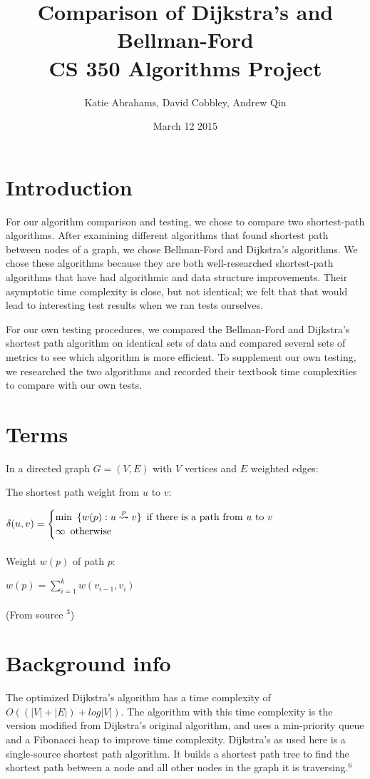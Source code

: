 \documentclass{article}
\title{Comparison of Dijkstra's and Bellman-Ford \\ CS 350 Algorithms Project}
\author{Katie Abrahams, David Cobbley, Andrew Qin}
\date{March 12 2015}
\begin{document}
\maketitle

\tableofcontents

\pagebreak

\section{Introduction}
For our algorithm comparison and testing, we chose to compare two shortest-path algorithms.  After examining different algorithms that found shortest path between nodes of a graph, we chose Bellman-Ford and Dijkstra's algorithms.  We chose these algorithms because they are both well-researched shortest-path algorithms that have had algorithmic and data structure improvements.  Their asymptotic time complexity is close, but not identical; we felt that that would lead to interesting test results when we ran tests ourselves.

For our own testing procedures, we compared the Bellman-Ford and Dijkstra's shortest path algorithm on identical sets of data and compared several sets of metrics to see which algorithm is more efficient.  To supplement our own testing, we researched the two algorithms and recorded their textbook time complexities to compare with our own tests.

\section{Terms}
In a directed graph $G=(V,E)$ with $V$ vertices and $E$ weighted edges:

The shortest path weight from $u$ to $v$:

$\delta(u,v) = \begin{cases}
\text{min} \hspace{5 pt} \{w(p):u\overset{p}{\leadsto}v\} \hspace{5 pt} \text{if there is a path from $u$ to $v$}\\
\infty \hspace{5 pt} \text{otherwise}
\end{cases}$
\\
\\
Weight $w(p)$ of path $p$:

$w(p)=\displaystyle\sum_{i=1}^{k} w(v_{i-1},v_{i})$
\\
\\
(From source $^3$)
\section{Background info}
The optimized Dijkstra's algorithm has a time complexity of $O((|V|+|E|)+log|V|)$.
The algorithm with this time complexity is the version modified from Dijkstra's original algorithm, and uses a min-priority queue and a Fibonacci heap to improve time complexity.  Dijkstra's as used here is a single-source shortest path algorithm.  It builds a shortest path tree to find the shortest path between a node and all other nodes in the graph it is traversing.$^6$
\end{document}
